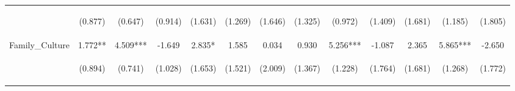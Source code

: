 \begin{tabular}{lcccccccccccc}
 & \begin{footnotesize}(0.877)\end{footnotesize} & \begin{footnotesize}(0.647)\end{footnotesize} & \begin{footnotesize}(0.914)\end{footnotesize} & \begin{footnotesize}(1.631)\end{footnotesize} & \begin{footnotesize}(1.269)\end{footnotesize} & \begin{footnotesize}(1.646)\end{footnotesize} & \begin{footnotesize}(1.325)\end{footnotesize} & \begin{footnotesize}(0.972)\end{footnotesize} & \begin{footnotesize}(1.409)\end{footnotesize} & \begin{footnotesize}(1.681)\end{footnotesize} & \begin{footnotesize}(1.185)\end{footnotesize} & \begin{footnotesize}(1.805)\end{footnotesize}\\
\noalign{\smallskip}Family_Culture & 1.772** & 4.509*** & -1.649 & 2.835* & 1.585 & 0.034 & 0.930 & 5.256*** & -1.087 & 2.365 & 5.865*** & -2.650\\
 & \begin{footnotesize}(0.894)\end{footnotesize} & \begin{footnotesize}(0.741)\end{footnotesize} & \begin{footnotesize}(1.028)\end{footnotesize} & \begin{footnotesize}(1.653)\end{footnotesize} & \begin{footnotesize}(1.521)\end{footnotesize} & \begin{footnotesize}(2.009)\end{footnotesize} & \begin{footnotesize}(1.367)\end{footnotesize} & \begin{footnotesize}(1.228)\end{footnotesize} & \begin{footnotesize}(1.764)\end{footnotesize} & \begin{footnotesize}(1.681)\end{footnotesize} & \begin{footnotesize}(1.268)\end{footnotesize} & \begin{footnotesize}(1.772)\end{footnotesize}\\

\end{tabular}
